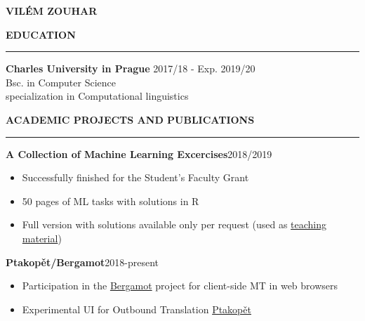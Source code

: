 \documentclass[11pt,a4paper]{article} %
\newcommand{\hSection}[1]{
    \medskip
    \MakeUppercase{\bf #1}
    \medskip
    \hrule
}
\newcommand{\hSubsectionI}[2]{{\bf #1}\hfill {#2}\hspace{-1cm}}
\begin{document}
\begin{center}
    {\LARGE \bf VILÉM ZOUHAR} \\
    {\large \href{mailto:vilem.zouhar@mff.cuni.cz}{\color{black}{vilem.zouhar@mff.cuni.cz}}}
\end{center}

\vspace{0.1cm}

\hSection{Education}\vspace{0.2cm}
{\bf Charles University in Prague} \hfill {2017/18 - Exp. 2019/20} \\
Bsc. in Computer Science \\
specialization in Computational linguistics 

\hSection{Academic Projects and Publications}

\hSubsectionI{A Collection of Machine Learning Excercises}{2018/2019}

\begin{itemize}
    \item Successfully finished for the Student's Faculty Grant
    \item 50 pages of ML tasks with solutions in R
    \item Full version with solutions available only per request (used as \href{http://ufal.mff.cuni.cz/courses/npfl054}{teaching material})
\end{itemize}

\hSubsectionI{Ptakopět/Bergamot}{2018-present}

\begin{itemize}
    \item Participation in the \href{http://browser.mt/}{Bergamot} project for client-side MT in web browsers
    \item Experimental UI for Outbound Translation \href{https://github.com/zouharvi/ptakopet}{Ptakopět}
\end{itemize}
\end{document}
